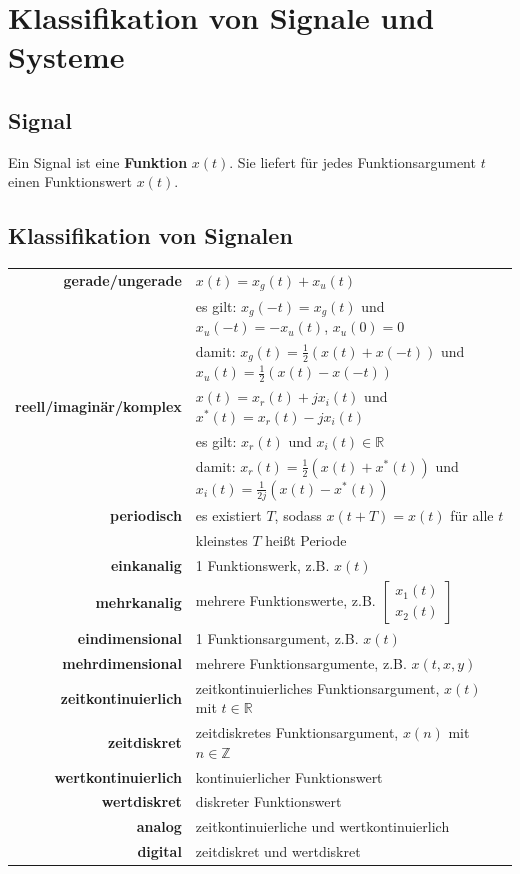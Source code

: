 \documentclass[10pt,a4paper]{article}
\author{Florian Euchner, Stefan Köbel, Chong Shen, Jan Frederik Dick}
\newcommand{\fancythumb}[2]{
	\addthumb{#1}{\large\sffamily\textbf{\space\space#1\vspace{5pt}}}{white}{#2}
}
\begin{document}
\section*{Klassifikation von Signale und Systeme}
\fancythumb{Klass.}{teal}
\subsection*{Signal}
Ein Signal ist eine \textbf{Funktion} $x(t)$. Sie liefert für jedes Funktionsargument $t$ einen Funktionswert $x(t)$.
\subsection*{Klassifikation von Signalen}
\begin{tabular}{r p{12cm}}
	\textbf{gerade/ungerade} & $x(t)=x_g(t)+x_u(t)$\\
	 & es gilt: $x_g(-t)=x_g(t)$ und $x_u(-t)=-x_u(t)$, $x_u(0)=0$\\
	 & damit: $x_g(t)=\frac{1}{2}(x(t)+x(-t))$ und $x_u(t)=\frac{1}{2}(x(t)-x(-t))$\\
	 \textbf{reell/imaginär/komplex} & $x(t)=x_r(t)+jx_i(t)$ und $x^*(t)=x_r(t)-jx_i(t)$\\
	 & es gilt: $x_r(t)$ und $x_i(t) \in \mathbb R$\\
	 & damit: $x_r(t)=\frac{1}{2}(x(t)+x^*(t))$ und $x_i(t)=\frac{1}{2j}(x(t)-x^*(t))$\\
	 \textbf{periodisch} & es existiert $T$, sodass $x(t+T)=x(t)$ für alle $t$\\
	 & kleinstes $T$ heißt Periode\\
	 \textbf{einkanalig} & 1 Funktionswerk, z.B. $x(t)$\\
	 \textbf{mehrkanalig} & mehrere Funktionswerte, z.B.
	$\begin{bmatrix}
		x_1(t) \\ 
		x_2(t)
	\end{bmatrix}$\\
	\textbf{eindimensional} & 1 Funktionsargument, z.B. $x(t)$\\
	\textbf{mehrdimensional} & mehrere Funktionsargumente, z.B. $x(t,x,y)$\\
	\textbf{zeitkontinuierlich} & zeitkontinuierliches Funktionsargument, $x(t)$ mit $t \in \mathbb R$\\
	\textbf{zeitdiskret} & zeitdiskretes Funktionsargument, $x(n)$ mit $n \in \mathbb Z$\\
	\textbf{wertkontinuierlich} & kontinuierlicher Funktionswert\\
	\textbf{wertdiskret} & diskreter Funktionswert\\
	\textbf{analog} & zeitkontinuierliche und wertkontinuierlich\\
	\textbf{digital} & zeitdiskret und wertdiskret\\
\end{tabular}
\end{document}
